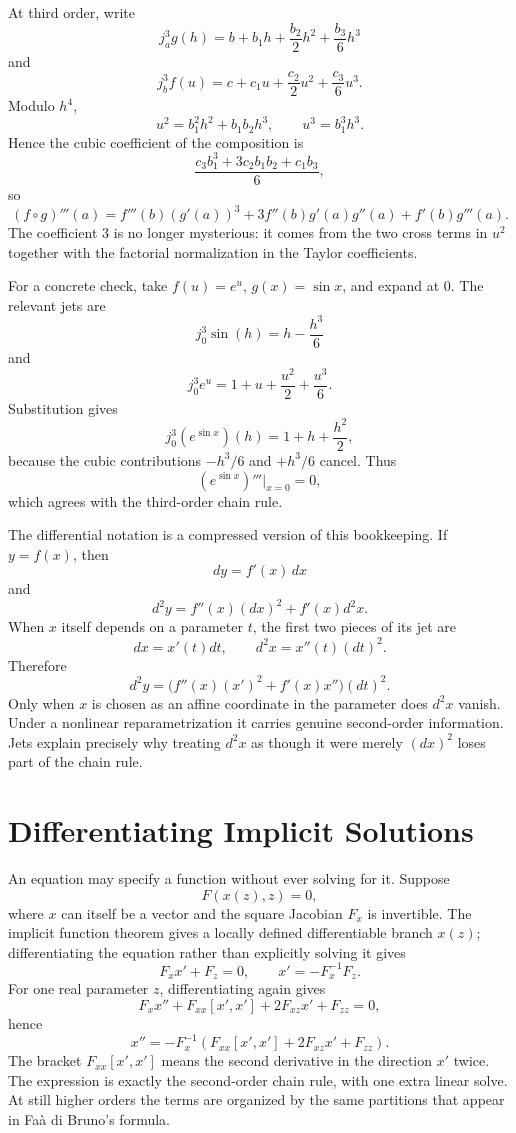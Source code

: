 At third order, write
\[
  j_a^3g(h)
  =b+b_1h+\frac{b_2}{2}h^2+\frac{b_3}{6}h^3
\]
and
\[
  j_b^3f(u)
  =c+c_1u+\frac{c_2}{2}u^2+\frac{c_3}{6}u^3.
\]
Modulo \(h^4\),
\[
  u^2=b_1^2h^2+b_1b_2h^3,
  \qquad
  u^3=b_1^3h^3.
\]
Hence the cubic coefficient of the composition is
\[
  \frac{c_3b_1^3+3c_2b_1b_2+c_1b_3}{6},
\]
so
\[
  (f\circ g)'''(a)
  =f'''(b)(g'(a))^3
  +3f''(b)g'(a)g''(a)
  +f'(b)g'''(a).
\]
The coefficient \(3\) is no longer mysterious: it comes from the two cross terms in \(u^2\) together with the factorial normalization in the Taylor coefficients.

For a concrete check, take \(f(u)=e^u\), \(g(x)=\sin x\), and expand at \(0\).  The relevant jets are
\[
  j_0^3\sin(h)=h-\frac{h^3}{6}
\]
and
\[
  j_0^3e^u=1+u+\frac{u^2}{2}+\frac{u^3}{6}.
\]
Substitution gives
\[
  j_0^3(e^{\sin x})(h)
  =1+h+\frac{h^2}{2},
\]
because the cubic contributions \(-h^3/6\) and \(+h^3/6\) cancel.  Thus
\[
  (e^{\sin x})'''\big|_{x=0}=0,
\]
which agrees with the third-order chain rule.

The differential notation is a compressed version of this bookkeeping.  If \(y=f(x)\), then
\[
  dy=f'(x)\,dx
\]
and
\[
  d^2y=f''(x)(dx)^2+f'(x)d^2x.
\]
When \(x\) itself depends on a parameter \(t\), the first two pieces of its jet are
\[
  dx=x'(t)dt,
  \qquad
  d^2x=x''(t)(dt)^2.
\]
Therefore
\[
  d^2y
  =\bigl(f''(x)(x')^2+f'(x)x''\bigr)(dt)^2.
\]
Only when \(x\) is chosen as an affine coordinate in the parameter does \(d^2x\) vanish.  Under a nonlinear reparametrization it carries genuine second-order information.  Jets explain precisely why treating \(d^2x\) as though it were merely \((dx)^2\) loses part of the chain rule.


\section{Differentiating Implicit Solutions}

An equation may specify a function without ever solving for it. Suppose
\[
 F(x(z),z)=0,
\]
where $x$ can itself be a vector and the square Jacobian $F_x$ is invertible. The implicit function theorem gives a locally defined differentiable branch $x(z)$; differentiating the equation rather than explicitly solving it gives
\[
 F_x x'+F_z=0,\qquad
 \boxed{x'=-F_x^{-1}F_z.}
\]
For one real parameter $z$, differentiating again gives
\[
 F_x x''+F_{xx}[x',x']+2F_{xz}x'+F_{zz}=0,
\]
hence
\[
 \boxed{x''=-F_x^{-1}\!
  \left(F_{xx}[x',x']+2F_{xz}x'+F_{zz}\right).}
\]
The bracket $F_{xx}[x',x']$ means the second derivative in the direction $x'$ twice. The expression is exactly the second-order chain rule, with one extra linear solve. At still higher orders the terms are organized by the same partitions that appear in Fa\`a di Bruno's formula.

